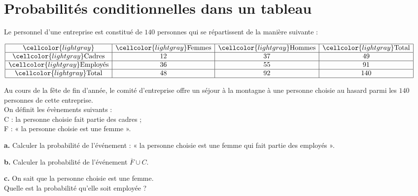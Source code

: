 \documentclass[11pt]{article}
\begin{document}
\section{Probabilités conditionnelles dans un tableau}

\begin{exercice}
 Le personnel d’une entreprise est constitué de $140$ personnes qui se
 répartissent de la manière suivante :
 \begin{center}
   $\renewcommand{\arraystretch}{1}
   \begin{array}{|c|c|c|c|}
     \hline
     \cellcolor{lightgray}  & \cellcolor{lightgray} \text{Femmes} & \cellcolor{lightgray} \text{Hommes} & \cellcolor{lightgray} \text{Total}\\
     \hline
     \cellcolor{lightgray} \text{Cadres} & 12 & 37 & 49\\
     \hline
     \cellcolor{lightgray} \text{Employés} & 36 & 55 & 91\\
     \hline
     \cellcolor{lightgray} \text{Total} & 48 & 92 & 140\\
     \hline
   \end{array}
   \renewcommand{\arraystretch}{1}$
 \end{center}
               Au cours de la fête de fin d’année, le comité
               d’entreprise offre un séjour à la montagne à une personne choisie au hasard parmi les $140$ personnes de cette
               entreprise.\\
               On définit les évènements suivants : \\
               C : \og{} la personne choisie fait partie des cadres
               \fg{} ; \\
               F : « la personne choisie est une femme ».

\medskip
\textbf {a.}   Calculer la probabilité de l'événement : « la personne choisie est une femme qui fait partie des employés ».

\medskip
\textbf {b.}   Calculer la probabilité de l'événement $\overline{F}\cup C$.

\medskip
\textbf {c.}   On sait que la personne choisie  est une femme.\\
          Quelle est la probabilité qu'elle soit employée ?
\end{exercice}
\end{document}

